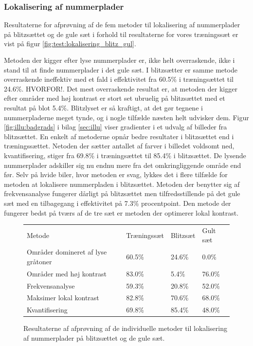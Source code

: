 \subsubsection{Lokalisering af nummerplader}
Resultaterne for afprøvning af de fem metoder til lokalisering af nummerplader på blitzsættet og de gule sæt i forhold til resultaterne for vores træningssæt er vist på figur \vref{fig:test:lokalisering_blitz_gul}.

Metoden der kigger efter lyse nummerplader er, ikke helt overraskende, ikke i stand til at finde nummerplader i det gule sæt. I blitzsætter er samme metode overraskende ineffektiv med et fald i effektivitet fra 60.5\% i træningsættet til 24.6\%. HVORFOR!. Det mest overraskende resultat er, at metoden der kigger efter områder med høj kontrast er stort set ubruelig på blitzsættet med et resultat på blot 5.4\%. Blitzlyset er så kraftigt, at det gør tegnene i nummerpladerne meget tynde, og i nogle tilfælde næsten helt udvisker dem. Figur \vref{fig:illu:badgrads} i bilag \ref{sec:illu} viser
gradienter i et udvalg af billeder fra blitzsættet. En enkelt af metoderne opnår bedre resultater i blitzsættet end i træningssættet. Netoden der sætter antallet af farver i billedet voldsomt ned, kvantifisering, stiger fra 69.8\% i træningsættet til 85.4\% i blitzsættet. De lysende nummerplader adskiller sig nu endnu mere fra det omkringliggende område end før. Selv på hvide biler, hvor metoden er svag, lykkes det i flere tilfælde for metoden at lokalisere nummerpladen i blitzsættet. Metoden der benytter sig af frekvensanalyse fungerer dårligt på blitzsættet men tilfredsstillende på det gule sæt med en tilbagegang i effektivitet på 7.3\% procentpoint. Den metode der fungerer bedst på tværs af de tre sæt er metoden der optimerer lokal kontrast.

\begin{figure}[htp]
\centering
\begin{tabular}{|l|l|l|l|}
\hline
\rowcolor[gray]{0.9} \multicolumn{4}{|>{\columncolor[gray]{0.9}}c|}{\textbf{Individuelle metoder til lokalisering}} \\ \hline
Metode & Træningssæt & Blitzsæt & Gult sæt\\ \hline
Områder domineret af lyse gråtoner & 60.5\% &  24.6\% & 0.0\%\\ \hline
Områder med høj kontrast & 83.0\% & 5.4\% & 76.0\%\\ \hline
Frekvensanalyse & 59.3\% &  20.8\% & 52.0\%\\ \hline
Maksimer lokal kontrast & 82.8\% &  70.6\% & 68.0\%\\ \hline
Kvantifisering & 69.8\% &  85.4\% & 48.0\%\\
\hline
\end{tabular}
\caption{Resultaterne af afprøvning af de individuelle metoder til lokalisering af nummerplader på blitzsættet og de gule sæt.}
\label{fig:test:lokalisering_blitz_gul}
\end{figure}



